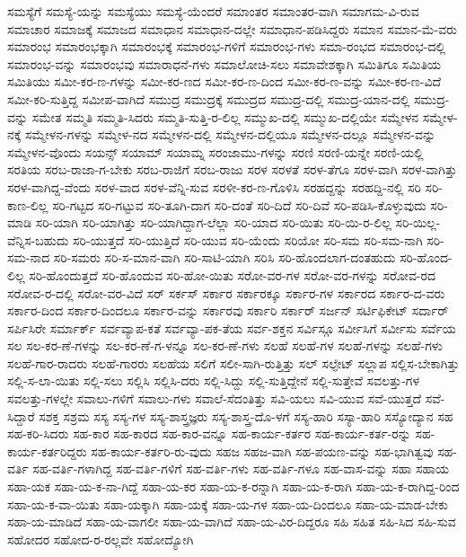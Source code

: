 {ಸಮಸ್ಯೆಗೆ
ಸಮಸ್ಯೆ-ಯನ್ನು
ಸಮಸ್ಯೆಯು
ಸಮಸ್ಯೆ-ಯೆಂದರೆ
ಸಮಾಂತರ
ಸಮಾಂತರ-ವಾಗಿ
ಸಮಾಗಮ-ವಿ-ರುವ
ಸಮಾಚಾರ
ಸಮಾಜಕ್ಕೆ
ಸಮಾಜದ
ಸಮಾಧಾನ
ಸಮಾಧಾನ-ದಲ್ಲೇ
ಸಮಾಧಾನ-ಪಡಿಸಿದ್ದರು
ಸಮಾನ
ಸಮಾನ-ಮೆ-ವರು
ಸಮಾರಂಭ
ಸಮಾರಂಭಕ್ಕಾಗಿ
ಸಮಾರಂಭಕ್ಕೆ
ಸಮಾರಂಭ-ಗಳಿಗೆ
ಸಮಾರಂಭ-ಗಳು
ಸಮಾ-ರಂಭದ
ಸಮಾರಂಭ-ದಲ್ಲಿ
ಸಮಾರಂಭ-ವನ್ನು
ಸಮಾರಂಭವು
ಸಮಾರಾಧನೆ-ಗಳು
ಸಮಾಲೋಚಿ-ಸಲು
ಸಮಾವೇಶಕ್ಕಾಗಿ
ಸಮಿತಿಗೂ
ಸಮಿತಿಯ
ಸಮಿತಿಯು
ಸಮೀ-ಕರ-ಣ-ಗಳನ್ನು
ಸಮೀ-ಕರ-ಣದ
ಸಮೀ-ಕರ-ಣ-ದಿಂದ
ಸಮೀ-ಕರ-ಣ-ವನ್ನು
ಸಮೀ-ಕರ-ಣ-ವಿದೆ
ಸಮೀ-ಕರಿ-ಸುತ್ತಿದ್ದ
ಸಮೀಪ-ವಾಗಿದೆ
ಸಮುದ್ರ
ಸಮುದ್ರಕ್ಕೆ
ಸಮುದ್ರದ
ಸಮುದ್ರ-ದಲ್ಲಿ
ಸಮುದ್ರ-ಯಾನ-ದಲ್ಲಿ
ಸಮುದ್ರ-ವನ್ನು
ಸಮೇತ
ಸಮ್ಮತಿ
ಸಮ್ಮತಿ-ಸಿದರು
ಸಮ್ಮತಿ-ಸುತ್ತಿ-ರ-ಲಿಲ್ಲ
ಸಮ್ಮುಖ-ದಲ್ಲಿ
ಸಮ್ಮುಖ-ದಲ್ಲಿಯೇ
ಸಮ್ಮೇಳನ
ಸಮ್ಮೇಳ-ನಕ್ಕೆ
ಸಮ್ಮೇಳನ-ಗಳನ್ನು
ಸಮ್ಮೇಳ-ನದ
ಸಮ್ಮೇಳನ-ದಲ್ಲಿ
ಸಮ್ಮೇಳನ-ದಲ್ಲಿಯೂ
ಸಮ್ಮೇಳನ-ದಲ್ಲೂ
ಸಮ್ಮೇಳನ-ವನ್ನು
ಸಮ್ಮೇಳನ-ವೊಂದು
ಸಯನ್ಸ್
ಸಯಾಮ್
ಸಯಾಮ್ನ
ಸರಂಜಾಮು-ಗಳನ್ನು
ಸರಣಿ
ಸರಣಿ-ಯನ್ನೇ
ಸರಣಿ-ಯಲ್ಲಿ
ಸರತಿಯ
ಸರಬ-ರಾಜಾ-ಗ-ಬೇಕು
ಸರಬ-ರಾಜಿಗೆ
ಸರಬ-ರಾಜು
ಸರಳ
ಸರಳತೆ
ಸರಳ-ತೆಗೂ
ಸರಳ-ವಾಗಿ
ಸರಳ-ವಾಗಿತ್ತು
ಸರಳ-ವಾಗಿದ್ದ-ವೆಂದು
ಸರಳ-ವಾದ
ಸರಳ-ವೆನ್ನಿ-ಸುವ
ಸರಳೀ-ಕರ-ಣ-ಗೊಳಿಸಿ
ಸರಹದ್ದನ್ನು
ಸರಹದ್ದಿ-ನಲ್ಲಿ
ಸರಿ
ಸರಿ-ಕಾಣ-ಲಿಲ್ಲ
ಸರಿ-ಗಟ್ಟದ
ಸರಿ-ಗಟ್ಟುವ
ಸರಿ-ತೂಗಿ-ದಾಗ
ಸರಿ-ದಂತೆ
ಸರಿ-ದಿದೆ
ಸರಿ-ದಿವೆ
ಸರಿ-ಪಡಿಸಿ-ಕೊಳ್ಳುವುದು
ಸರಿ-ಮಾಡಿ
ಸರಿ-ಯಾಗಿ
ಸರಿ-ಯಾಗಿತ್ತು
ಸರಿ-ಯಾಗಿದ್ದಾಗ-ಲೆಲ್ಲಾ
ಸರಿ-ಯಾದ
ಸರಿ-ಯಿತು
ಸರಿ-ಯಿ-ರ-ಲಿಲ್ಲ
ಸರಿ-ಯಿಲ್ಲ-ವೆನ್ನಿಸ-ಬಹುದು
ಸರಿ-ಯುತ್ತದೆ
ಸರಿ-ಯುತ್ತಿದೆ
ಸರಿ-ಯುವ
ಸರಿ-ಯೆಂದು
ಸರಿಯೋ
ಸರಿ-ಸಮ
ಸರಿ-ಸಮ-ನಾಗಿ
ಸರಿ-ಸಮ-ನಾದ
ಸರಿ-ಸಮರು
ಸರಿ-ಸ-ಮಾನ-ವಾಗಿ
ಸರಿ-ಸಾಟಿ-ಯಾಗಿ
ಸರಿಸಿ
ಸರಿ-ಹೊಂದಲಾಗ-ದಂತಹುದು
ಸರಿ-ಹೊಂದ-ಲಿಲ್ಲ
ಸರಿ-ಹೊಂದುತ್ತದೆ
ಸರಿ-ಹೊಂದುವ
ಸರಿ-ಹೋ-ಯಿತು
ಸರೋ-ವರ-ಗಳ
ಸರೋ-ವರ-ಗಳನ್ನು
ಸರೋವ-ರದ
ಸರೋವ-ರ-ದಲ್ಲಿ
ಸರೋ-ವರ-ವಿದೆ
ಸರ್
ಸರ್ಕಸ್
ಸರ್ಕಾರ
ಸರ್ಕಾರಕ್ಕೂ
ಸರ್ಕಾರ-ಗಳ
ಸರ್ಕಾರದ
ಸರ್ಕಾರ-ದ-ವರು
ಸರ್ಕಾರ-ದಿಂದ
ಸರ್ಕಾರ-ದಿಂದಲೂ
ಸರ್ಕಾರ-ವನ್ನು
ಸರ್ಕಾರವು
ಸರ್ಕಾರಿ
ಸರ್ಕಾರ್
ಸರ್ಜನ್
ಸರ್ಟಿಫಿಕೇಟ್
ಸರ್ದಾರ್
ಸರ್ಪಿಸಿರೇ
ಸರ್ಮಾರ್ಕ್
ಸರ್ವವ್ಯಾಪ-ಕತೆ
ಸರ್ವವ್ಯಾ-ಪಕ-ತೆಯ
ಸರ್ವ-ಶಕ್ತನ
ಸರ್ವಿಸ್ಗೂ
ಸರ್ವೀಸಿಗೆ
ಸರ್ವೀಸು
ಸರ್ವೆಯ
ಸಲ
ಸಲ-ಕರ-ಣೆ-ಗಳನ್ನು
ಸಲ-ಕರ-ಣೆ-ಗ-ಳನ್ನೂ
ಸಲ-ಕರ-ಣೆ-ಗಳು
ಸಲಹೆ
ಸಲಹೆ-ಗಳ
ಸಲಹೆ-ಗಳನ್ನು
ಸಲಹೆ-ಗಳು
ಸಲಹೆ-ಗಾರ-ರಾದರು
ಸಲಹೆ-ಗಾರರು
ಸಲಹೆಯ
ಸಲಿಗೆ
ಸಲೀ-ಸಾಗಿ-ರುತ್ತಿತ್ತು
ಸಲ್
ಸಲ್ಫೇಟ್
ಸಲ್ಲಾಪ
ಸಲ್ಲಿಸ-ಬೇಕಾಗಿತ್ತು
ಸಲ್ಲಿ-ಸ-ಲಾ-ಯಿತು
ಸಲ್ಲಿ-ಸಲು
ಸಲ್ಲಿಸಿ
ಸಲ್ಲಿಸಿ-ದರು
ಸಲ್ಲಿ-ಸಿದ್ದು
ಸಲ್ಲಿ-ಸುತ್ತಿದ್ದೇನೆ
ಸಲ್ಲಿ-ಸುತ್ತೇವೆ
ಸವಲತ್ತು-ಗಳ
ಸವಲತ್ತು-ಗಳಲ್ಲೇ
ಸವಾಲು-ಗಳಿಗೆ
ಸವಾಲು-ಗಳು
ಸವಾಲೆ-ಸೆದಂತಿತ್ತು
ಸವಿ-ಯಲು
ಸವಿ-ಯುವ
ಸವೆ-ಯುತ್ತದೆ
ಸವೆ-ಸಿದ್ದಾರೆ
ಸಶಕ್ತ
ಸಶ್ರಮ
ಸಸ್ಯ
ಸಸ್ಯ-ಗಳ
ಸಸ್ಯ-ಶಾಸ್ತ್ರಜ್ಞರು
ಸಸ್ಯ-ಶಾಸ್ತ್ರ-ದೊ-ಳಗೆ
ಸಸ್ಯ-ಹಾರಿ
ಸಸ್ಯಾ-ಹಾರಿ
ಸಸ್ಯೋದ್ಯಾನ
ಸಹ
ಸಹ-ಕರಿ-ಸಿದರು
ಸಹ-ಕಾರ
ಸಹ-ಕಾರದ
ಸಹ-ಕಾರ-ವನ್ನೂ
ಸಹ-ಕಾರ್ಯ-ಕರ್ತರ
ಸಹ-ಕಾರ್ಯ-ಕರ್ತ-ರನ್ನು
ಸಹ-ಕಾರ್ಯ-ಕರ್ತರಿದ್ದರು
ಸಹ-ಕಾರ್ಯ-ಕರ್ತರಿ-ರು-ವುದು
ಸಹಜ
ಸಹಜ-ವಾಗಿ
ಸಹ-ಪಯಣ-ವನ್ನು
ಸಹ-ಭಾಗಿತ್ವವು
ಸಹ-ವರ್ತಿ
ಸಹ-ವರ್ತಿ-ಗಳಾಗಿದ್ದ
ಸಹ-ವರ್ತಿ-ಗಳಿಗೆ
ಸಹ-ವರ್ತಿ-ಗಳು
ಸಹ-ವರ್ತಿ-ಗಳೂ
ಸಹ-ವಾಸ-ವನ್ನು
ಸಹಾ
ಸಹಾಯ
ಸಹಾ-ಯಕ
ಸಹಾ-ಯ-ಕ-ನಾ-ಗಿದ್ದೆ
ಸಹಾ-ಯ-ಕರ
ಸಹಾ-ಯ-ಕ-ರನ್ನಾಗಿ
ಸಹಾ-ಯ-ಕ-ರಾಗಿ
ಸಹಾ-ಯ-ಕ-ರಾಗಿದ್ದ-ರಿಂದ
ಸಹಾ-ಯ-ಕ-ವಾ-ಯಿತು
ಸಹಾ-ಯಕ್ಕಾಗಿ
ಸಹಾ-ಯಕ್ಕೆ
ಸಹಾ-ಯ-ಗಳ
ಸಹಾ-ಯ-ದಿಂದಲೂ
ಸಹಾ-ಯ-ಮಾಡ-ಬೇಕು
ಸಹಾ-ಯ-ಮಾಡಿದೆ
ಸಹಾ-ಯ-ವಾಗಲೀ
ಸಹಾ-ಯ-ವಾಗಿದೆ
ಸಹಾ-ಯ-ವಿರ-ದಿದ್ದರೂ
ಸಹಿ
ಸಹಿತ
ಸಹಿ-ಸಿದ
ಸಹಿ-ಸುವ
ಸಹೋದರ
ಸಹೋದ-ರ-ರಲ್ಲವೇ
ಸಹೋದ್ಯೋಗಿ
}
